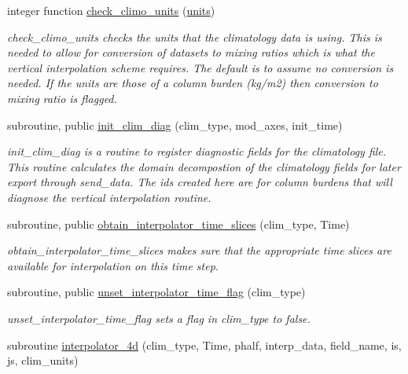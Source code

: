 \begin{DoxyCompactItemize}
integer function \hyperlink{namespaceinterpolator__mod_a964d51ef7fd4e420ca8306497ef88279}{check\+\_\+climo\+\_\+units} (\hyperlink{namespaceinterpolator__mod_a36fe3672b1616046ddec710084683407}{units})
\begin{DoxyCompactList}\small\item\em check\+\_\+climo\+\_\+units checks the units that the climatology data is using. This is needed to allow for conversion of datasets to mixing ratios which is what the vertical interpolation scheme requires. The default is to assume no conversion is needed. If the units are those of a column burden (kg/m2) then conversion to mixing ratio is flagged. \end{DoxyCompactList}\item 
subroutine, public \hyperlink{namespaceinterpolator__mod_a06df9761d5d17f3a33ad65fc800099d1}{init\+\_\+clim\+\_\+diag} (clim\+\_\+type, mod\+\_\+axes, init\+\_\+time)
\begin{DoxyCompactList}\small\item\em init\+\_\+clim\+\_\+diag is a routine to register diagnostic fields for the climatology file. This routine calculates the domain decompostion of the climatology fields for later export through send\+\_\+data. The ids created here are for column burdens that will diagnose the vertical interpolation routine. \end{DoxyCompactList}\item 
subroutine, public \hyperlink{namespaceinterpolator__mod_af7a99acaf1d46d5729cf55d4544b685b}{obtain\+\_\+interpolator\+\_\+time\+\_\+slices} (clim\+\_\+type, Time)
\begin{DoxyCompactList}\small\item\em obtain\+\_\+interpolator\+\_\+time\+\_\+slices makes sure that the appropriate time slices are available for interpolation on this time step. \end{DoxyCompactList}\item 
subroutine, public \hyperlink{namespaceinterpolator__mod_a75dd97cee018ee8dfe45361b82c8ed01}{unset\+\_\+interpolator\+\_\+time\+\_\+flag} (clim\+\_\+type)
\begin{DoxyCompactList}\small\item\em unset\+\_\+interpolator\+\_\+time\+\_\+flag sets a flag in clim\+\_\+type to false. \end{DoxyCompactList}\item 
subroutine \hyperlink{namespaceinterpolator__mod_aa7289f28ea8f0fb09694f8cd62b16cc4}{interpolator\+\_\+4d} (clim\+\_\+type, Time, phalf, interp\+\_\+data, field\+\_\+name, is, js, clim\+\_\+units)

\end{DoxyCompactItemize}
